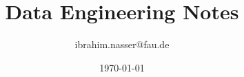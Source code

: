 \usepackage{graphicx}
\usepackage{booktabs}
\usepackage{parskip}
\usepackage{tcolorbox}
\usepackage[fleqn]{amsmath}
\usepackage{multicol}
\usepackage{csquotes}
\usepackage{amsmath}
\usepackage{multicol}
\usepackage{float}
\usepackage{amssymb}
\usepackage{gensymb}
\usepackage[inline]{enumitem}
\usepackage{titling}
\usepackage[margin=0.5in]{geometry}
\usepackage{array}
\usepackage{amsmath}
\usepackage{natbib}
\usepackage{hyperref}
\newcommand{\commandnote}[1]{
    \begin{tcolorbox}[
        standard jigsaw,
        title=Note,
    ]
        #1
    \end{tcolorbox}
}
\newcommand{\minititle}[1]{
\subsubsection*{#1}
}

\newcommand{\mydef}[2]{
    \textbf{#1: }#2
}
\newcommand{\set}[1]{\{#1\}}

\title{Data Engineering Notes}
\author{ibrahim.nasser@fau.de}
\date{\today}